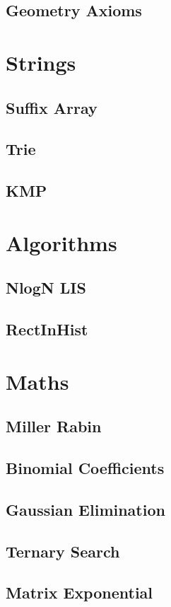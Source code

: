 \documentclass[twocolumn]{article}
\begin{document}
        \subsection{Geometry Axioms}
        

    \newpage
    \section{Strings}
        \subsection{Suffix Array}
        
        \subsection{Trie}
        
        \subsection{KMP}
        


    \newpage
    \section{Algorithms}
        \subsection{NlogN LIS}
        
        \subsection{RectInHist}
        

    \newpage
    \section{Maths}
        \subsection{Miller Rabin}
        
        \subsection{Binomial Coefficients}
        
        
        \subsection{Gaussian Elimination}
        
        \subsection{Ternary Search}
        
        \subsection{Matrix Exponential}
        
\end{document}
